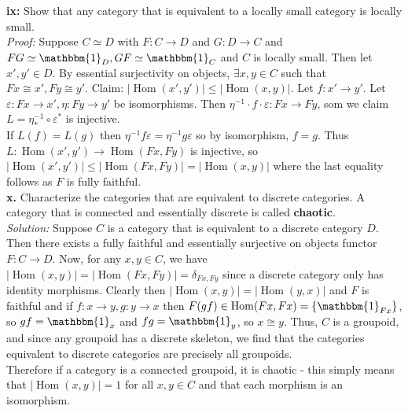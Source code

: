 \documentclass[a4paper]{article}
\theoremstyle{plain}%
\theoremstyle{definition}
\theoremstyle{remark}
\DeclareMathOperator{\Hom}{Hom}
\begin{document}
\textbf{ix:} Show that any category that is equivalent to a locally small
category is locally small.\\
\linebreak
\textit{Proof:} Suppose $ C \simeq D$ with $F  \colon C\to D$ and $G  \colon
D \to C$ and $FG \simeq \mathbbm{1}_{D}, GF \simeq \mathbbm{1}_{C}$ and $C$ is locally
small. Then let $x',y' \in D$. By essential surjectivity on objects, $\exists 
x,y \in C$ such that $Fx \cong x', Fy \cong y'$. Claim:
$\left| \Hom(x',y') \right| \le  \left| \Hom(x,y) \right| $.
Let $f  \colon x' \to y'$. Let $\varepsilon  \colon Fx \to x',
\eta  \colon Fy \to y'$ be isomorphisms. Then
$\eta^{-1} \cdot f \cdot \varepsilon  \colon Fx \to Fy$, som we claim
$L = \eta^{-1}_* \circ \varepsilon^{*}$ is injective.\\
If $L(f) = L(g)$ then
$\eta^{-1} f \varepsilon = \eta^{-1} g \varepsilon$ so by isomorphism,
$f = g$. Thus
 $L  \colon \Hom(x',y') \to \Hom(Fx,Fy)$ is injective, so
 $\left| \Hom(x',y') \right| \le \left| \Hom(Fx, Fy) \right| 
 = \left| \Hom(x,y) \right| $ where the last equality follows as $F$ is fully
 faithful.\\
 \linebreak
 \textbf{x.} Characterize the categories that are equivalent to discrete
 categories. A category that is connected and essentially discrete is called
 \textbf{chaotic}.\\
 \linebreak
 \textit{Solution:} Suppose $C$ is a category that is equivalent to a discrete
 category $D$. Then there exists a fully faithful and essentially surjective on
 objects functor $F  \colon C \to D$. Now, for any $x,y \in C$, we have
 $\left| \Hom(x,y) \right| = \left| \Hom(Fx, Fy) \right| 
 = \delta_{Fx,Fy}$ since a discrete category only has identity morphisms.
 Clearly then $\left| \Hom(x,y) \right| =
 \left| \Hom(y,x) \right| $ and $F$ is faithful and
 if $f  \colon x\to y, g  \colon y \to x$ then
 $F(gf) \in \Hom(Fx,Fx) = \left\{ \mathbbm{1}_{Fx} \right\} $, so
 $gf = \mathbbm{1}_{x}$ and $fg = \mathbbm{1}_{y}$, so $x \cong y$. Thus,
 $C$ is a groupoid, and since any groupoid has a discrete skeleton, we find
 that the categories equivalent to discrete categories are precisely all
 groupoids.\\
 \linebreak
 Therefore if a category is a connected groupoid, it is chaotic - this simply
 means that $\left| \Hom(x,y) \right| =1$ for all $x,y \in C$ and
 that each morphism is an isomorphism. 
\end{document}
